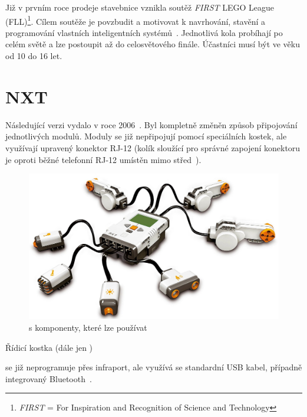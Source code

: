 Již v prvním roce prodeje stavebnice vznikla soutěž {\it FIRST} LEGO League (FLL)\footnote{{\it FIRST} = For Inspiration and Recognition of Science and Technology}. 
Cílem soutěže je povzbudit a motivovat k navrhování, stavění a programování vlastních inteligentních systémů~\cite{lego_FLL-about}. 
Jednotlivá kola probíhají po celém světě a lze postoupit až do celosvětového finále. %
Účastníci musí být ve věku od 10 do 16 let. 

\section{\legoM{ }NXT}

Následující verzi vydalo \lego{ }v roce 2006~\cite{lego_mindstormsHistory}. 
Byl kompletně změněn způsob připojování jednotlivých modulů. 
Moduly se již nepřipojují pomocí speciálních \lego{ }kostek, ale využívají upravený konektor RJ-12 %
(kolík sloužící pro správné zapojení konektoru je oproti běžné telefonní RJ-12 umístěn mimo střed~\cite{legoMindstorms_rj12-connector}). %

\begin{figure}[h]
	\centering
	\includegraphics[width=\textwidth]{images/lego-mindstorms-nxt_with-modules.jpg}
	\caption[\legoNXT{ }s komponenty, které lze používat]{\legoNXT{ }s komponenty, které lze používat\protect\footnotemark}
	\label{fig:lego-mindstorms-nxt_with-modules}
\end{figure}

Řídicí kostka (dále jen \brick{}) %

se již neprogramuje přes infraport, ale využívá se standardní USB kabel, případně integrovaný Bluetooth~\cite{legoMindstormsNXT_hardware}.

